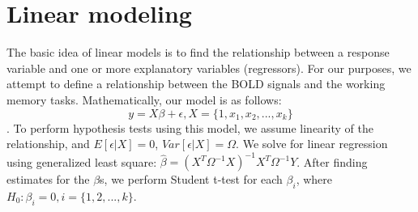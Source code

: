 \section{Linear modeling} The basic idea of linear models is to find the
relationship between a response variable and one or more explanatory variables
(regressors). For our purposes, we attempt to define a relationship between the
BOLD signals and the working memory tasks. Mathematically, our model is as
follows: $$ y = X \beta + \epsilon, X = \{1, x_1, x_2, ..., x_k\}$$. To perform
hypothesis tests using this model, we assume linearity of the relationship, and
$E [\epsilon | X ] = 0$, $Var [ \epsilon | X ] = \Omega$. We solve for linear
regression using generalized least square: $\hat{\beta} = (X^T \Omega^{-1}
X)^{-1} X^T \Omega^{-1} Y$. After finding estimates for the $\beta$s, we perform
Student t-test for each $\beta_i$, where $H_0: \beta_i = 0, i = \{1, 2, ...,
k\}$.
